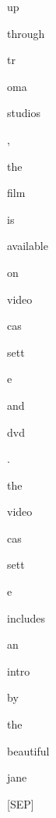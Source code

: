 \documentclass[varwidth=150mm]{standalone}
\begin{document}
\begin{CJK*}{UTF8}{gbsn}
{{{\colorbox{red!0.0}{\strut up} \colorbox{red!0.0}{\strut through} \colorbox{red!1.6514637470245361}{\strut tr}\colorbox{red!4.9355597496032715}{\strut oma} \colorbox{red!0.0}{\strut studios} \colorbox{red!0.0}{\strut ,} \colorbox{red!13.338483810424805}{\strut the} \colorbox{red!9.253801345825195}{\strut film} \colorbox{red!5.520615577697754}{\strut is} \colorbox{red!1.73367440700531}{\strut available} \colorbox{red!1.9078556299209595}{\strut on} \colorbox{red!1.3070108890533447}{\strut video}\colorbox{red!2.536355495452881}{\strut cas}\colorbox{red!3.6042237281799316}{\strut sett}\colorbox{red!2.3985793590545654}{\strut e} \colorbox{red!1.212856650352478}{\strut and} \colorbox{red!3.5748908519744873}{\strut dvd} \colorbox{red!0.0}{\strut .} \colorbox{red!6.812168121337891}{\strut the} \colorbox{red!2.5376806259155273}{\strut video}\colorbox{red!1.1223686933517456}{\strut cas}\colorbox{red!3.261013984680176}{\strut sett}\colorbox{red!1.3976547718048096}{\strut e} \colorbox{red!2.8138539791107178}{\strut includes} \colorbox{red!5.0725603103637695}{\strut an} \colorbox{red!9.058995246887207}{\strut intro} \colorbox{red!4.810726642608643}{\strut by} \colorbox{red!6.900572776794434}{\strut the} \colorbox{red!21.1110782623291}{\strut beautiful} \colorbox{red!18.594114303588867}{\strut jane} \colorbox{red!2.0220930576324463}{\strut [SEP]}
}}}
\end{CJK*}
\end{document}
